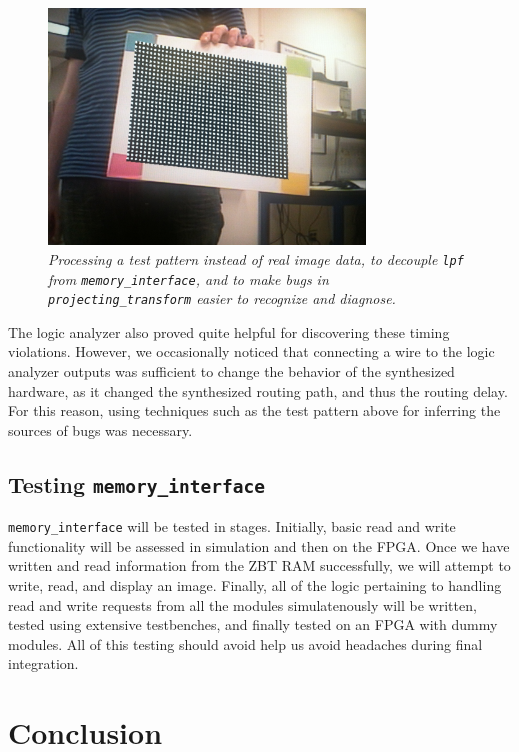 \documentclass[10pt]{article}
\begin{document}
{\begin{figure}[h!]
\centering
\includegraphics[width=0.75\textwidth]{images/IMG_0121.JPG}
\caption{\emph{Processing a test pattern instead of real image data, to decouple {\tt lpf} from {\tt memory\_interface}, and to make bugs in {\tt projecting\_transform} easier to recognize and diagnose.}}
\end{figure}

The logic analyzer also proved quite helpful for discovering these timing violations. However, we occasionally noticed that connecting a wire to the logic analyzer outputs was sufficient to change the behavior of the synthesized hardware, as it changed the synthesized routing path, and thus the routing delay. For this reason, using techniques such as the test pattern above for inferring the sources of bugs was necessary.

\subsection{Testing {\tt memory\_interface}}
{\tt memory\_interface} will be tested in stages. Initially, basic read and write functionality will be assessed in simulation and then on the FPGA. Once we have written and read information from the ZBT RAM successfully, we will attempt to write, read, and display an image. Finally, all of the logic pertaining to handling read and write requests from all the modules simulatenously will be written, tested using extensive testbenches, and finally tested on an FPGA with dummy modules. All of this testing should avoid help us avoid headaches during final integration.


\section{Conclusion}



}
\end{document}
